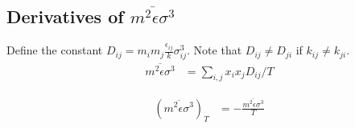 \documentclass[internal,english]{sintefmemo2012}
\newcommand{\z}{\zeta}
\begin{document}





\subsection{Derivatives of $\overline{m^2\epsilon \sigma^3}$}
Define the constant $D_{ij} = m_i m_j \frac{\epsilon_{ij}}{k} \sigma_{ij}^3$. Note that
$D_{ij} \neq D_{ji}$ if $k_{ij} \neq k_{ji}$.
\begin{align}
  \overline{m^2\epsilon \sigma^3} &= \sum_{i,j} x_i x_j D_{ij}/T
\end{align}

\begin{align}
  (\overline{m^2\epsilon \sigma^3})_T &=  -\frac{\overline{m^2\epsilon \sigma^3}}{T}
\end{align}
\end{document}
